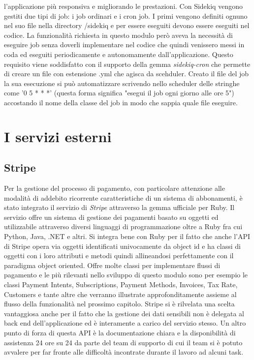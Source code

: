 \documentclass[target=bach,aauheader=,style=]{thud}
\begin{document}
l'applicazione più responsiva e migliorando le prestazioni. Con Sidekiq vengono gestiti due tipi di job: i job ordinari e i cron job. I primi vengono definiti ognuno nel suo file nella directory
/sidekiq e per essere eseguiti devono essere eseguiti nel codice. La funzionalità richiesta in questo modulo però aveva la necessità di eseguire job senza doverli implementare nel codice che quindi
venissero messi in coda ed eseguiti periodicamente e autonomamente dall'applicazione. Questo requisito viene soddisfatto con il supporto della gemma \textit{sidekiq-cron}\cite{sidekiq_cron_gem} che
permette di creare un file con estensione .yml che agisca da scehduler. Creato il file del job la sua esecuzione si può automatizzare scrivendo nello scheduler delle stringhe come '0 5 * * *' (questa forma
significa "esegui il job ogni giorno alle ore 5") accostando il nome della classe del job in modo che sappia quale file eseguire.

\section{I servizi esterni}

\subsection{Stripe}

Per la gestione del processo di pagamento, con particolare attenzione alle modalità di addebito ricorrente caratteristiche di un sistema di abbonamenti,
è stato integrato il servizio di \textit{Stripe}\cite{stripe} attraverso la gemma ufficiale per Ruby\cite{stripe_ruby_gem}. Il servizio offre un sistema di gestione dei pagamenti
basato su oggetti ed utilizzabile attraverso diversi linguaggi di programmazione oltre a Ruby fra cui Python, Java, .NET e altri. Si integra
bene con Ruby per il fatto che anche l'API di Stripe opera via oggetti identificati univocamente da object id e ha classi di oggetti con i loro attributi e metodi quindi allineandosi
perfettamente con il paradigma object oriented.
Offre molte classi per implementare flussi di pagamento e le più rilevanti nello sviluppo di questo modulo sono per esempio le classi Payment Intents, Subscriptions, Payment Methods,
Invoices, Tax Rate, Customers e tante altre che verranno illustrate approfonditamente assieme al flusso della funzionalità nel prossimo capitolo.
Stripe si è rilvelata una scelta vantaggiosa anche per il fatto che la gestione dei dati sensibili non è delegata al back end dell'applicazione ed è interamente
a carico del servizio stesso. Un altro punto di forza di questa API è la documentazione chiara\cite{stripe_api_reference} e la disponibilità di assistenza 24 ore su 24 da parte
del team di supporto di cui il team si è potuto avvalere per far fronte alle difficoltà incontrate durante il lavoro ad alcuni task.
\end{document}
